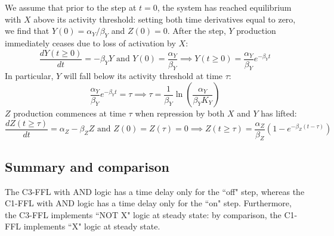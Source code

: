 \documentclass{article}
\begin{document}
{We assume that prior to the step at $t=0$, the system has reached equilibrium with $X$ above its activity threshold: setting both time derivatives equal to zero, we find that $Y(0)=\alpha_Y/\beta_Y$ and $Z(0) = 0$. After the step, $Y$ production immediately ceases due to loss of activation by $X$:
\[ \frac{dY(t \geq 0)}{dt} = - \beta_Y Y \textrm{ and } Y(0) = \frac{\alpha_Y}{\beta_Y}  \implies Y(t \geq 0) = \frac{\alpha_Y}{\beta_Y} e^{-\beta_Y t} \]
In particular, $Y$ will fall below its activity threshold at time $\tau$:
\[ \frac{\alpha_Y}{\beta_Y} e^{-\beta_Y t} = \tau \implies \tau = \frac{1}{\beta_Y} \ln \left( \frac{\alpha_Y}{\beta_Y K_Y} \right) \]
$Z$ production commences at time $\tau$ when repression by both $X$ and $Y$ has lifted:
\[ \frac{dZ(t \geq \tau)}{dt} = \alpha_Z - \beta_Z Z \textrm{ and } Z(0) = Z(\tau) = 0 \implies Z(t \geq \tau) = \frac{\alpha_Z}{\beta_Z} \left( 1 - e^{-\beta_Z (t-\tau)} \right) \]

\subsection*{Summary and comparison}

The C3-FFL with AND logic has a time delay only for the ``off" step, whereas the C1-FFL with AND logic has a time delay only for the ``on" step. Furthermore, the C3-FFL implements ``NOT X" logic at steady state: by comparison, the C1-FFL implements ``X" logic at steady state.

}
\end{document}
